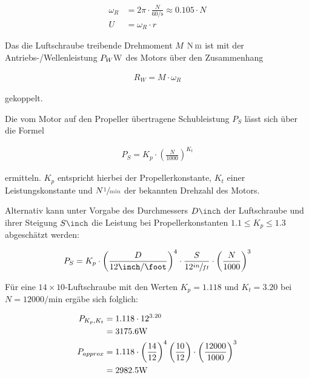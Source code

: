 \begin{align}
	\omega_R &= 2\pi \cdot \frac{N}{60 \si{\per\second}} \approx 0.105 \cdot N \\
	U &= \omega_R \cdot r
\end{align}

\bigbreak

Das die Luftschraube treibende Drehmoment $M$ $\withunit{\newton\meter}$ ist mit der Antriebs-/Wellenleistung $P_W \withunit{\watt}$ des Motors über den Zusammenhang

\begin{align}
	R_W = M \cdot \omega_R
\end{align}

gekoppelt.

\bigbreak {}

Die vom Motor auf den Propeller übertragene Schubleistung $P_S$ lässt sich über die Formel

\begin{align}
	P_S = K_p \cdot \left(\frac{N}{1000}\right)^{K_t}
\end{align}

ermitteln. $K_p$ entspricht hierbei der Propellerkonstante, $K_t$ einer Leistungskonstante  und $N \withunit{\per\minute}$ der bekannten Drehzahl des Motors.

\bigbreak

Alternativ kann unter Vorgabe des Durchmessers $D \withunit{\inch}$ der Luftschraube und ihrer Steigung $S \withunit{\inch}$ die Leistung bei Propellerkonstanten $1.1 \leq K_p \leq 1.3$ abgeschätzt werden:

\begin{align}
	P_S = K_p \cdot \left(\frac{D}{12 \si{\inch\per\foot}}\right)^4 \cdot \frac{S}{12 \sfrac{in}{ft}} \cdot \left(\frac{N}{1000}\right)^3
\end{align}

Für eine $14\times 10$-Luftschraube mit den Werten $K_p = 1.118$ und $K_t = 3.20$ bei $N = 12000 \si{\per\minute}$  ergäbe sich folglich:

\begin{align}
	P_{K_p,K_t} &= 1.118 \cdot 12^{3.20} \\ &= 3175.6 \si{\watt} \notag\\
	P_{approx} &= 1.118 \cdot \left(\frac{14}{12}\right)^4 \left(\frac{10}{12}\right) \cdot \left(\frac{12000}{1000}\right)^3 \\ &= 2982.5 \si{\watt} \notag
\end{align}

